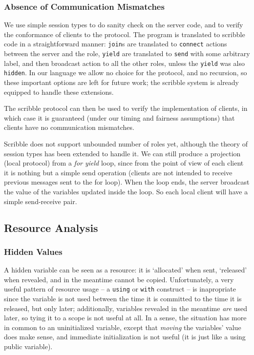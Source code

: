 \documentclass[acmsmall,review,anonymous]{acmart}\settopmatter{printfolios=true,printccs=false,printacmref=false}
\begin{document}
\subsubsection{Absence of Communication Mismatches}
We use simple session types to do sanity check on the server code, and to verify the conformance of clients to the protocol. The program is translated to scribble code in a straightforward manner: \texttt{join}s are translated to \texttt{connect} actions between the server and the role, \texttt{yield} are translated to \texttt{send} with some arbitrary label, and then broadcast action to all the other roles, unless the \texttt{yield} was also \texttt{hidden}. In our language we allow no choice for the protocol, and no recursion, so these important options are left for future work; the scribble system is already equipped to handle these extensions.

The scribble protocol can then be used to verify the implementation of clients, in which case it is guaranteed (under our timing and fairness assumptions) that clients have no communication mismatches.

Scribble does not support unbounded number of roles yet, although the theory of session types has been extended to handle it. We can still produce a projection (local protocol) from a \textit{for yield} loop, since from the point of view of each client it is nothing but a simple send operation (clients are not intended to receive previous messages sent to the for loop). When the loop ends, the server broadcast the value of the variables updated inside the loop. So each local client will have a simple send-receive pair.

\subsection{Resource Analysis}
\subsubsection{Hidden Values}
A hidden variable can be seen as a resource: it is `allocated' when sent, `released' when revealed, and in the meantime cannot be copied. Unfortunately, a very useful pattern of resource usage -- a \texttt{using} or \texttt{with} construct -- is inapropriate since the variable is not used between the time it is committed to the time it is released, but only later; additionally, variables revealed in the meantime \textit{are} used later, so tying it to a scope is not useful at all. In a sense, the situation has more in common to an uninitialized variable, except that \textit{moving} the variables' value does make sense, and immediate initialization is not useful (it is just like a using public variable).
\end{document}
